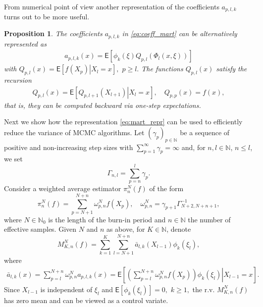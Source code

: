 \documentclass[article]{elsarticle}
\newtheorem{prop}[thm]{Proposition}
\begin{document}
From  numerical point of view another representation of the coefficients \(a_{p,l,k}\)  turns out to be more useful.
\begin{prop}
The coefficients \(a_{p,l,k}\) in \eqref{eq:coeff_mart}  can be alternatively represented as
\begin{eqnarray*}
a_{p,l,k}(x)=\mathsf{E}\left[\phi_k\left(\xi\right)Q_{p,l}\left(\Phi_l(x,\xi)\right)\right]
\end{eqnarray*}
with \(Q_{p,l}(x)=\mathsf{E}\left[\left.f(X_{p})\right|X_{l}=x\right],\) \(p\geq l.\)
The functions \(Q_{p,l}(x)\)   satisfy the recursion
\begin{eqnarray}
\label{eq:qpl}
Q_{p,l}(x)=\mathsf{E}\left[\left.Q_{p,l+1}(X_{l+1})\right|X_{l}=x\right],\quad Q_{p,p}(x)=f(x),
\end{eqnarray}
that is, they can be computed backward via  one-step expectations.
\end{prop}
Next we show how  the representation \eqref{eq:mart_repr} can be used to efficiently reduce the variance of MCMC algorithms.  Let $(\gamma_{p})_{p\in\mathbb N}$ be a sequence of positive and non-increasing
step sizes
with $\sum_{p=1}^\infty \gamma_p=\infty$
and, for $n,l\in\mathbb{N}$, $n\le l$, we set
\[
\Gamma_{n,l}=\sum_{p=n}^{l}\gamma_{p}.
\]
 Consider a weighted average estimator $\pi_{n}^{N}(f)$ of the form
\begin{equation}\label{eq:29032018a2}
\pi_{n}^{N}(f)=\sum_{p=N+1}^{N+n}\omega_{p,n}^{N}f(X_{p}),\quad\omega_{p,n}^{N}=\gamma_{p+1}\Gamma_{N+2,N+n+1}^{-1},
\end{equation}
where $N\in\mathbb N_0$ is the length of the burn-in period and $n\in\mathbb N$
the number of effective samples.
Given $N$ and $n$ as above, for $K\in\mathbb N$, denote
\begin{equation}
M_{K,n}^N(f) =\sum_{k=1}^{K}\sum_{l=N+1}^{N+n}\bar a_{l,k}(X_{l-1})\phi_k(\xi_{l}),
\label{eq:29032018a5}
\end{equation}
where
\begin{align}
\label{eq:first-expression-bar-a-l-k}
\bar{a}_{l,k}(x)
=\sum_{p=l}^{N+n}\omega_{p,n}^{N}a_{p,l,k}(x)=\mathsf{E}\left[\left.\left(\sum_{p=l}^{N+n}\omega_{p,n}^{N}f(X_{p})\right)\phi_k(\xi_{l})\right|X_{l-1}=x\right].
\end{align}
Since \(X_{l-1}\) is independent of \(\xi_{l}\) and \(\mathsf{E}[\phi_k(\xi_{l})]=0,\) \(k\geq 1,\)  the r.v.  \(M_{K,n}^N(f)\) has zero mean and can be viewed as a control variate. 
\end{document}
